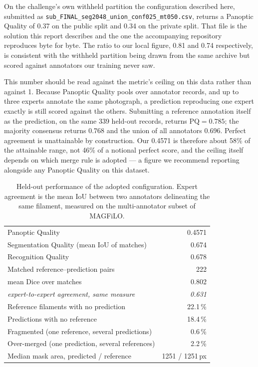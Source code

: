 \documentclass[sigconf]{acmart}
\begin{document}
    On the challenge's own withheld partition the configuration described here, submitted as \texttt{sub\_FINAL\_seg2048\_union\_conf025\_mt050.csv}, returns a Panoptic Quality of 0.37 on the public split and 0.34 on the private split. That file is the solution this report describes and the one the accompanying repository reproduces byte for byte. The ratio to our local figure, 0.81 and 0.74 respectively, is consistent with the withheld partition being drawn from the same archive but scored against annotators our training never saw.

    This number should be read against the metric's ceiling on this data rather than against 1. Because Panoptic Quality pools over annotator records, and up to three experts annotate the same photograph, a prediction reproducing one expert exactly is still scored against the others. Submitting a reference annotation itself as the prediction, on the same 339 held-out records, returns $\mathrm{PQ}=0.785$; the majority consensus returns 0.768 and the union of all annotators 0.696. Perfect agreement is unattainable by construction. Our 0.4571 is therefore about 58\% of the attainable range, not 46\% of a notional perfect score, and the ceiling itself depends on which merge rule is adopted --- a figure we recommend reporting alongside any Panoptic Quality on this dataset.

\begin{table}[t]
  \caption{Held-out performance of the adopted configuration. Expert agreement is the mean IoU between two annotators delineating the same filament, measured on the multi-annotator subset of MAGFiLO.}
  \label{tab:results}
  \begin{tabular}{lr}
    \toprule
    Panoptic Quality & 0.4571 \\
    \quad Segmentation Quality (mean IoU of matches) & 0.674 \\
    \quad Recognition Quality & 0.678 \\
    \midrule
    Matched reference--prediction pairs & 222 \\
    \quad mean Dice over matches & 0.802 \\
    \quad \emph{expert-to-expert agreement, same measure} & \emph{0.631} \\
    \midrule
    Reference filaments with no prediction & 22.1\,\% \\
    Predictions with no reference & 18.4\,\% \\
    Fragmented (one reference, several predictions) & 0.6\,\% \\
    Over-merged (one prediction, several references) & 2.2\,\% \\
    \midrule
    Median mask area, predicted / reference & 1251 / 1251\,px \\
    \bottomrule
  \end{tabular}
\end{table}
\end{document}
